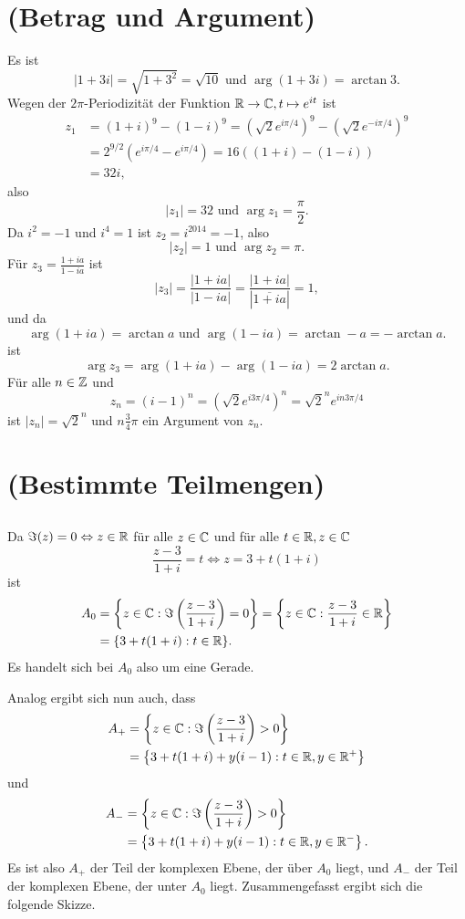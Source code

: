 \documentclass[a4paper,10pt]{article}
\begin{document}
\section{(Betrag und Argument)}
Es ist
\[
 |1+3i| = \sqrt{1+3^2} = \sqrt{10} \text{ und } \arg (1+3i) = \arctan 3.
\]
Wegen der $2\pi$-Periodizität der Funktion $\mathbb{R} \to \mathbb{C}, t \mapsto e^{it}$ ist
\begin{align*}
 z_1
 &= (1+i)^9 - (1-i)^9
 = \left(\sqrt{2}e^{i\pi/4}\right)^9 - \left(\sqrt{2}e^{-i\pi/4}\right)^9 \\
 &= 2^{9/2} (e^{i\pi/4}-e^{i\pi/4})
 = 16 ((1+i)-(1-i)) \\
 &= 32i,
\end{align*}
also
\[
 |z_1| = 32 \text{ und } \arg z_1 = \frac{\pi}{2}.
\]
Da $i^2 = -1$ und $i^4 = 1$ ist $ z_2 = i^{2014} = -1$, also
\[
 |z_2| = 1 \text{ und } \arg z_2 = \pi.
\]
Für $z_3 = \frac{1+ia}{1-ia}$ ist
\[
 \left|z_3\right|
 = \frac{|1+ia|}{|1-ia|}
 = \frac{|1+ia|}{\left|\overline{1+ia}\right|}
 = 1,
\]
und da
\[
 \arg (1+ia) = \arctan a \text{ und } \arg (1-ia) = \arctan -a = - \arctan a.
\]
ist
\[
 \arg z_3 = \arg (1+ia) - \arg (1-ia) = 2 \arctan a.
\]
Für alle $n \in \mathbb{Z}$ und
\[
 z_n = (i-1)^n = \left(\sqrt{2}e^{i3\pi/4}\right)^n = \sqrt{2}^n e^{in3\pi/4}
\]
ist $|z_n| = \sqrt{2}^n$ und $n\frac{3}{4}\pi$ ein Argument von $z_n$.





\section{(Bestimmte Teilmengen)}


\subsection{}
Da $\Im(z) = 0 \Leftrightarrow z \in \mathbb{R}$ für alle $z \in \mathbb{C}$ und für alle $t \in \mathbb{R}, z \in \mathbb{C}$
\[
 \frac{z-3}{1+i} = t \Leftrightarrow z = 3+t(1+i)
\]
ist
\begin{align*}
 A_0
 &= \left\{ z \in \mathbb{C} : \Im\left( \frac{z-3}{1+i} \right) = 0 \right\}
 = \left\{ z \in \mathbb{C} : \frac{z-3}{1+i} \in \mathbb{R} \right\} \\
 &= \{ 3+t(1+i) : t \in \mathbb{R} \}.
\end{align*}
Es handelt sich bei $A_0$ also um eine Gerade.

Analog ergibt sich nun auch, dass
\begin{align*}
 A_+
 &= \left\{z \in \mathbb{C} : \Im\left( \frac{z-3}{1+i} \right) > 0 \right\} \\
 &= \left\{3 + t(1+i) + y(i-1) : t \in \mathbb{R}, y \in \mathbb{R}^+\right\}
\end{align*}
und
\begin{align*}
 A_-
 &= \left\{z \in \mathbb{C} : \Im\left( \frac{z-3}{1+i} \right) > 0 \right\} \\
 &= \left\{3 + t(1+i) + y(i-1) : t \in \mathbb{R}, y \in \mathbb{R}^-\right\}.
\end{align*}
Es ist also $A_+$ der Teil der komplexen Ebene, der über $A_0$ liegt, und $A_-$ der Teil der komplexen Ebene, der unter $A_0$ liegt.
Zusammengefasst ergibt sich die folgende Skizze.
\end{document}
